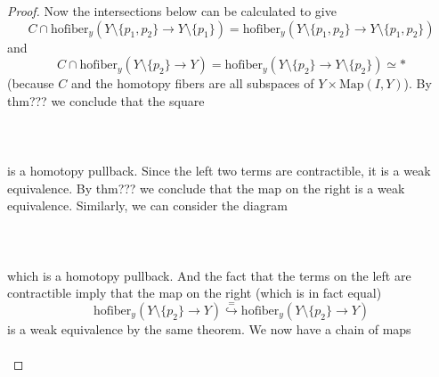 \documentclass[a4paper]{article}
\begin{document}
\begin{prp}{}{}
\begin{proof}
Now the intersections below can be calculated to give $$C\cap\text{hofiber}_y(Y\setminus\{p_1,p_2\}\to Y\setminus\{p_1\})=\text{hofiber}_y(Y\setminus\{p_1,p_2\}\to Y\setminus\{p_1,p_2\})$$ and $$C\cap\text{hofiber}_y(Y\setminus\{p_2\}\to Y)=\text{hofiber}_y(Y\setminus\{p_2\}\to Y\setminus\{p_2\})\simeq\ast$$ (because $C$ and the homotopy fibers are all subspaces of $Y\times\text{Map}(I,Y)$). By thm??? we conclude that the square \\~\\
\\~\\
is a homotopy pullback. Since the left two terms are contractible, it is a weak equivalence. By thm??? we conclude that the map on the right is a weak equivalence. Similarly, we can consider the diagram \\~\\
\\~\\
which is a homotopy pullback. And the fact that the terms on the left are contractible imply that the map on the right (which is in fact equal) $$\text{hofiber}_y(Y\setminus\{p_2\}\to Y)\overset{=}{\hookrightarrow}\text{hofiber}_y(Y\setminus\{p_2\}\to Y)$$ is a weak equivalence by the same theorem. We now have a chain of maps \\~\\
\end{proof}
\end{prp}
\end{document}
